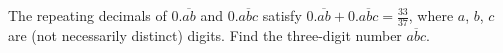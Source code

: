 The repeating decimals of $0.\overline{ab}$ and $0.\overline{abc}$ satisfy $0.\overline{ab}+0.\overline{abc}=\frac{33}{37}$, where $a$, $b$, $c$ are (not necessarily distinct) digits. Find the three-digit number $\overline{abc}$. 
